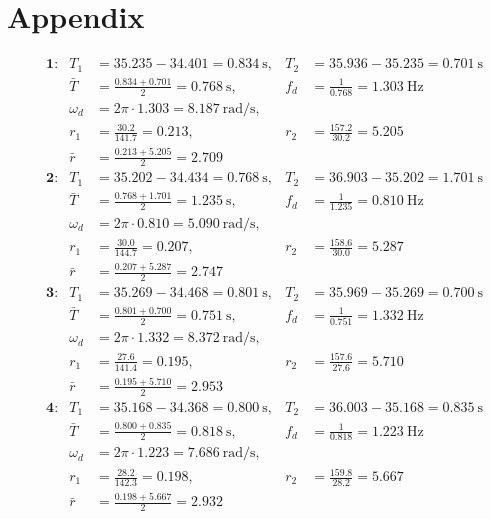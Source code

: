 \documentclass[11pt,a4paper]{article}
\begin{document}
\section{Appendix}
\par
\begin{align*}
&\textbf{1:} & T_1 &= 35.235-34.401 = 0.834~\text{s}, & T_2 &= 35.936-35.235 = 0.701~\text{s} \\
& & \bar{T} &= \frac{0.834+0.701}{2} = 0.768~\text{s}, & f_d &= \frac{1}{0.768} = 1.303~\text{Hz} \\
& & \omega_d &= 2\pi \cdot 1.303 = 8.187~\text{rad/s}, & & \\
& & r_1 &= \frac{30.2}{141.7} = 0.213, & r_2 &= \frac{157.2}{30.2} = 5.205 \\
& & \bar{r} &= \frac{0.213+5.205}{2} = 2.709 & & \\[6pt]
&\textbf{2:} & T_1 &= 35.202-34.434 = 0.768~\text{s}, & T_2 &= 36.903-35.202 = 1.701~\text{s} \\
& & \bar{T} &= \frac{0.768+1.701}{2} = 1.235~\text{s}, & f_d &= \frac{1}{1.235} = 0.810~\text{Hz} \\
& & \omega_d &= 2\pi \cdot 0.810 = 5.090~\text{rad/s}, & & \\
& & r_1 &= \frac{30.0}{144.7} = 0.207, & r_2 &= \frac{158.6}{30.0} = 5.287 \\
& & \bar{r} &= \frac{0.207+5.287}{2} = 2.747 & & \\[6pt]
&\textbf{3:} & T_1 &= 35.269-34.468 = 0.801~\text{s}, & T_2 &= 35.969-35.269 = 0.700~\text{s} \\
& & \bar{T} &= \frac{0.801+0.700}{2} = 0.751~\text{s}, & f_d &= \frac{1}{0.751} = 1.332~\text{Hz} \\
& & \omega_d &= 2\pi \cdot 1.332 = 8.372~\text{rad/s}, & & \\
& & r_1 &= \frac{27.6}{141.4} = 0.195, & r_2 &= \frac{157.6}{27.6} = 5.710 \\
& & \bar{r} &= \frac{0.195+5.710}{2} = 2.953 & & \\[6pt]
&\textbf{4:} & T_1 &= 35.168-34.368 = 0.800~\text{s}, & T_2 &= 36.003-35.168 = 0.835~\text{s} \\
& & \bar{T} &= \frac{0.800+0.835}{2} = 0.818~\text{s}, & f_d &= \frac{1}{0.818} = 1.223~\text{Hz} \\
& & \omega_d &= 2\pi \cdot 1.223 = 7.686~\text{rad/s}, & & \\
& & r_1 &= \frac{28.2}{142.3} = 0.198, & r_2 &= \frac{159.8}{28.2} = 5.667 \\
& & \bar{r} &= \frac{0.198+5.667}{2} = 2.932 & &
\end{align*}
\end{document}

